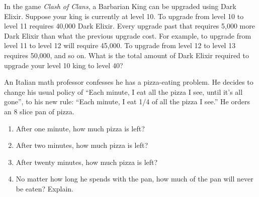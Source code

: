 \begin{exercise}{\Coffeecup }
In the game \emph{Clash of Clans}, a Barbarian King can be upgraded using Dark Elixir.  Suppose your king is currently at level 10.  To upgrade from level 10 to level 11 requires 40,000 Dark Elixir.  Every upgrade past that requires 5,000 more Dark Elixir than what the previous upgrade cost.  For example, to upgrade from level 11 to level 12 will require 45,000.  To upgrade from level 12 to level 13 requires 50,000, and so on.  What is the total amount of Dark Elixir required to upgrade your level 10 king to level 40?

\end{exercise}

\begin{exercise}{\Coffeecup \Coffeecup }
An Italian math professor confesses he has a pizza-eating problem.  He decides to change his usual policy of ``Each minute, I eat all the pizza I see, until it's all gone'', to his new rule: ``Each minute, I eat 1/4 of all the pizza I see.''  He orders an 8 slice pan of pizza.

\begin{enumerate}[label=\alph*.)]
\item After one minute, how much pizza is left?
\item After two minutes, how much pizza is left?
\item After twenty minutes, how much pizza is left?
\item No matter how long he spends with the pan, how much of the pan will never be eaten?  Explain.
\end{enumerate}
\end{exercise}


